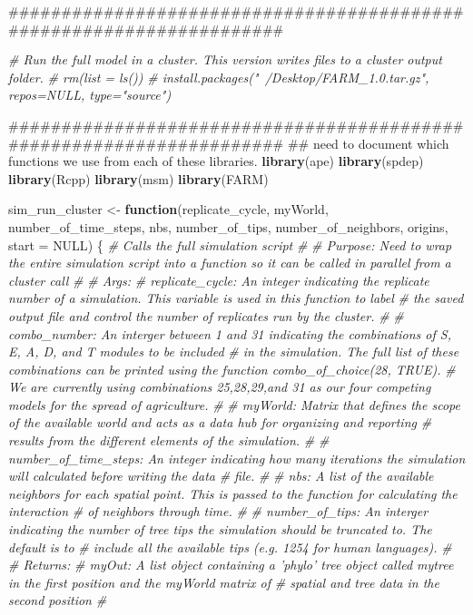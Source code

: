\documentclass[]{book}
\newenvironment{Shaded}{\begin{snugshade}}{\end{snugshade}}
\newcommand{\KeywordTok}[1]{\textcolor[rgb]{0.13,0.29,0.53}{\textbf{{#1}}}}
\newcommand{\DataTypeTok}[1]{\textcolor[rgb]{0.13,0.29,0.53}{{#1}}}
\newcommand{\StringTok}[1]{\textcolor[rgb]{0.31,0.60,0.02}{{#1}}}
\newcommand{\CommentTok}[1]{\textcolor[rgb]{0.56,0.35,0.01}{\textit{{#1}}}}
\newcommand{\OtherTok}[1]{\textcolor[rgb]{0.56,0.35,0.01}{{#1}}}
\newcommand{\ControlFlowTok}[1]{\textcolor[rgb]{0.13,0.29,0.53}{\textbf{{#1}}}}
\newcommand{\NormalTok}[1]{{#1}}
\theoremstyle{definition}
\theoremstyle{definition}
\theoremstyle{remark}
\begin{document}
\begin{Shaded}
\begin{Highlighting}[]
\NormalTok{#####################################################################}

\CommentTok{# Run the full model in a cluster. This version writes files to a cluster output folder.}
\CommentTok{# rm(list = ls())}
\CommentTok{# install.packages("~/Desktop/FARM_1.0.tar.gz", repos=NULL, type="source")}


\NormalTok{#####################################################################}
\NormalTok{## need to document which functions we use from each of these libraries. }
\KeywordTok{library}\NormalTok{(ape)}
\KeywordTok{library}\NormalTok{(spdep)}
\KeywordTok{library}\NormalTok{(Rcpp)}
\KeywordTok{library}\NormalTok{(msm)}
\KeywordTok{library}\NormalTok{(FARM)}


\NormalTok{sim_run_cluster <-}\StringTok{ }\ControlFlowTok{function}\NormalTok{(replicate_cycle, myWorld, number_of_time_steps, nbs,}
\NormalTok{                            number_of_tips, number_of_neighbors, origins, }\DataTypeTok{start =} \OtherTok{NULL}\NormalTok{) \{}
  \CommentTok{# Calls the full simulation script }
  \CommentTok{#  }
  \CommentTok{# Purpose: Need to wrap the entire simulation script into a function so it can be called in parallel from a cluster call  }
  \CommentTok{#}
  \CommentTok{# Args:}
  \CommentTok{#    replicate_cycle: An integer indicating the replicate number of a simulation. This variable is used in this function to label        }
  \CommentTok{#         the saved output file and control the number of replicates run by the cluster.}
  \CommentTok{#}
  \CommentTok{#    combo_number: An interger between 1 and 31 indicating the combinations of S, E, A, D, and T modules to be included }
  \CommentTok{#         in the simulation. The full list of these combinations can be printed using the function combo_of_choice(28, TRUE).}
  \CommentTok{#         We are currently using combinations 25,28,29,and 31 as our four competing models for the spread of agriculture.  }
  \CommentTok{#}
  \CommentTok{#    myWorld: Matrix that defines the scope of the available world and acts as a data hub for organizing and reporting      }
  \CommentTok{#         results from the different elements of the simulation. }
  \CommentTok{#}
  \CommentTok{#    number_of_time_steps: An integer indicating how many iterations the simulation will calculated before writing the data }
  \CommentTok{#         file. }
  \CommentTok{#}
  \CommentTok{#    nbs: A list of the available neighbors for each spatial point. This is passed to the function for calculating the interaction }
  \CommentTok{#         of neighbors through time. }
  \CommentTok{#}
  \CommentTok{#    number_of_tips: An interger indicating the number of tree tips the simulation should be truncated to. The default is to }
  \CommentTok{#         include all the available tips (e.g. 1254 for human languages). }
  \CommentTok{#}
  \CommentTok{# Returns: }
  \CommentTok{#    myOut: A list object containing a 'phylo' tree object called mytree in the first position and the myWorld matrix of }
  \CommentTok{#         spatial and tree data in the second position }
  \CommentTok{#     }
  


\end{Highlighting}
\end{Shaded}
\end{document}

